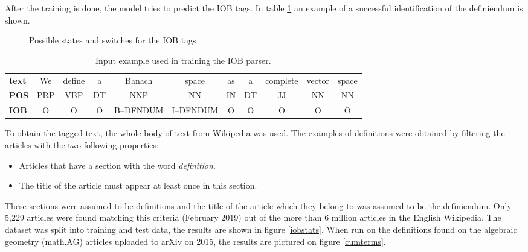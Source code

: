 \documentclass[a4paper]{easychair}
\begin{document}
After the training  is done, the model tries to predict the IOB tags. In table \ref{iobtags} an example of a successful identification of the definiendum is shown.
 \begin{figure}[h]
     \centering
{}
     \caption{\label{iobfsm} Possible states and switches for the IOB tags}
\end{figure}



\begin{table}[h]
    \begin{center}
        {\scriptsize
        \begin{tabular}{lcccccccccc}
        \hline
            \textbf{text} &We & define & a & Banach & space & as & a & complete & vector & space \\
            \textbf{POS}&PRP & VBP & DT & NNP & NN & IN & DT & JJ & NN & NN\\
            \textbf{IOB} & O& O& O& B--DFNDUM & I--DFNDUM & O& O& O& O& O \\
         \hline
    \end{tabular}
        \caption{\label{iobtags} Input example used in  training the IOB parser.}}
    \end{center} 
\end{table}

To obtain the tagged text, the whole body of text from Wikipedia was used. The examples of definitions were obtained by filtering the articles with the two following properties:
\begin{itemize}
    \item Articles that have a section with the word \textit{definition}.
    \item The title of the article must appear at least once in this section.
\end{itemize}
These sections were assumed to be definitions and the title of the article which they belong to was assumed to be the definiendum.  Only 5,229 articles were found matching this criteria (February 2019) out of the more than 6 million articles in the English Wikipedia. The dataset was split into training and test data, the results are shown in figure \ref{iobstats}. When run on the definitions found on the algebraic geometry (math.AG) articles uploaded to arXiv on 2015, the results are pictured on figure \ref{cumterms}.
\end{document}
